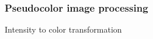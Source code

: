\documentclass{beamer}
\begin{document}
\begin{frame}
\frametitle{Pseudocolor image processing}
\begin{block}{Intensity to color transformation}
\begin{columns}
\end{columns}
\end{block}
\end{frame}
\end{document}
